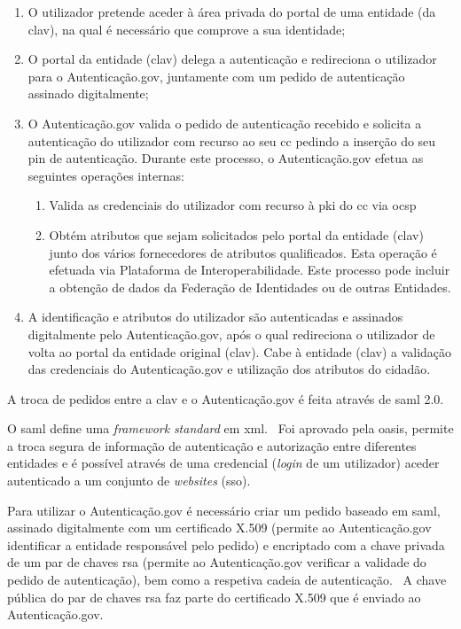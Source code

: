 \begin{enumerate}
    \item O utilizador pretende aceder à área privada do portal de uma entidade (da \acrshort{clav}), na qual é necessário que comprove a sua identidade;
    \item O portal da entidade (\acrshort{clav}) delega a autenticação e redireciona o utilizador para o Autenticação.gov, juntamente com um pedido de autenticação assinado digitalmente;
    \item O Autenticação.gov valida o pedido de autenticação recebido e solicita a autenticação do utilizador com recurso ao seu \acrshort{cc} pedindo a inserção do seu \acrshort{pin} de autenticação. Durante este processo, o Autenticação.gov efetua as seguintes operações internas:
    \begin{enumerate}
        \item Valida as credenciais do utilizador com recurso à \acrshort{pki} do \acrshort{cc} via \acrshort{ocsp}
        \item Obtém atributos que sejam solicitados pelo portal da entidade (\acrshort{clav}) junto dos vários fornecedores de atributos qualificados. Esta operação é efetuada via Plataforma de Interoperabilidade. Este processo pode incluir a obtenção de dados da Federação de Identidades ou de outras Entidades.
    \end{enumerate}
    \item A identificação e atributos do utilizador são autenticadas e assinados digitalmente pelo Autenticação.gov, após o qual redireciona o utilizador de volta ao portal da entidade original (\acrshort{clav}). Cabe à entidade (\acrshort{clav}) a validação das credenciais do Autenticação.gov e utilização dos atributos do cidadão.
\end{enumerate}

A troca de pedidos entre a \acrshort{clav} e o Autenticação.gov é feita através de \acrshort{saml} 2.0.

O \acrfull{saml} define uma \textit{framework} \textit{standard} em \acrshort{xml}.~\cite{sam2man} Foi aprovado pela \acrshort{oasis}, permite a troca segura de informação de autenticação e autorização entre diferentes entidades e é possível através de uma credencial (\textit{login} de um utilizador) aceder autenticado a um conjunto de \textit{websites} (\acrshort{sso}).

Para utilizar o Autenticação.gov é necessário criar um pedido baseado em \acrshort{saml}, assinado digitalmente com um certificado X.509 (permite ao Autenticação.gov identificar a entidade responsável pelo pedido) e encriptado com a chave privada de um par de chaves \acrshort{rsa} (permite ao Autenticação.gov verificar a validade do pedido de autenticação), bem como a respetiva cadeia de autenticação.~\cite{otavioTese} A chave pública do par de chaves \acrshort{rsa} faz parte do certificado X.509 que é enviado ao Autenticação.gov.

